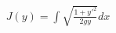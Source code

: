 \documentclass[preview]{standalone}
\begin{document}
\begin{align*}
J(y) = \int \sqrt{\frac{1 + y'^2}{2gy}} dx
\end{align*}
\end{document}
